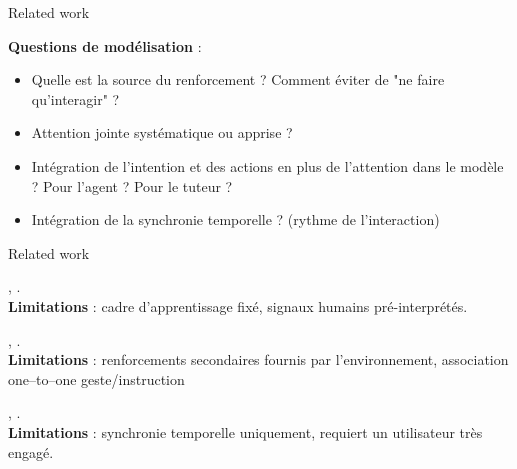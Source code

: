 \documentclass[xcolor=pst,dvips,12pt,english,french]{beamer}
\begin{document}
	\begin{frame}{Related work}
		\begin{block}{}
			\textbf{Questions de modélisation} :
			\begin{itemize}
				\item Quelle est la source du renforcement ? Comment éviter de "ne faire qu'interagir" ?
				\item Attention jointe systématique ou apprise ?
				\item Intégration de l'intention et des actions en plus de l'attention dans le modèle ? Pour l'agent ? Pour le tuteur ? 
				\item Intégration de la synchronie temporelle ? (rythme de l'interaction)
			\end{itemize}
		\end{block}
	\end{frame}
	
	\begin{frame}{Related work}
		\begin{block}{}
			\small
			, \citeauthor{knox2009}.\\
			\textbf{Limitations} : cadre d'apprentissage fixé, signaux humains pré-interprétés.
		\end{block}
		\begin{block}{}
			\small
			, \citeauthor{najar}.\\
			\textbf{Limitations} : renforcements secondaires fournis par l'environnement, association one--to--one geste/instruction
		\end{block}
		\begin{block}{}
			\small
			, \citeauthor{grand2014}.\\
			\textbf{Limitations} : synchronie temporelle uniquement, requiert un utilisateur très engagé.
		\end{block}
	\end{frame}
	

	
	
	
\end{document}
